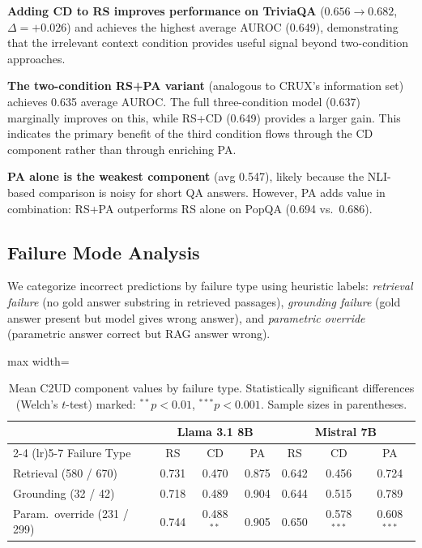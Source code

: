 \documentclass{article}
\newcommand{\ours}{\textsc{C2UD}}
\begin{document}
\textbf{Adding CD to RS improves performance on TriviaQA} ($0.656 \to 0.682$, $\Delta = +0.026$) and achieves the highest average AUROC (0.649), demonstrating that the irrelevant context condition provides useful signal beyond two-condition approaches.

\textbf{The two-condition RS+PA variant} (analogous to CRUX's information set) achieves 0.635 average AUROC.
The full three-condition model (0.637) marginally improves on this, while RS+CD (0.649) provides a larger gain.
This indicates the primary benefit of the third condition flows through the CD component rather than through enriching PA.

\textbf{PA alone is the weakest component} (avg 0.547), likely because the NLI-based comparison is noisy for short QA answers.
However, PA adds value in combination: RS+PA outperforms RS alone on PopQA (0.694 vs.\ 0.686).

\subsection{Failure Mode Analysis}
\label{sec:failure}

We categorize incorrect predictions by failure type using heuristic labels: \emph{retrieval failure} (no gold answer substring in retrieved passages), \emph{grounding failure} (gold answer present but model gives wrong answer), and \emph{parametric override} (parametric answer correct but RAG answer wrong).

\begin{table}[t]
\caption{Mean \ours{} component values by failure type. Statistically significant differences (Welch's $t$-test) marked: $^{**}p < 0.01$, $^{***}p < 0.001$. Sample sizes in parentheses.}
\label{tab:failure}
\centering
\begin{adjustbox}{max width=\textwidth}
\begin{tabular}{l ccc ccc}
\toprule
& \multicolumn{3}{c}{Llama 3.1 8B} & \multicolumn{3}{c}{Mistral 7B} \\
\cmidrule(lr){2-4} \cmidrule(lr){5-7}
Failure Type & RS & CD & PA & RS & CD & PA \\
\midrule
Retrieval (580 / 670) & 0.731 & 0.470 & 0.875 & 0.642 & 0.456 & 0.724 \\
Grounding (32 / 42) & 0.718 & 0.489 & 0.904 & 0.644 & 0.515 & 0.789 \\
Param.\ override (231 / 299) & 0.744 & 0.488$^{**}$ & 0.905 & 0.650 & 0.578$^{***}$ & 0.608$^{***}$ \\
\bottomrule
\end{tabular}
\end{adjustbox}
\end{table}
\end{document}
